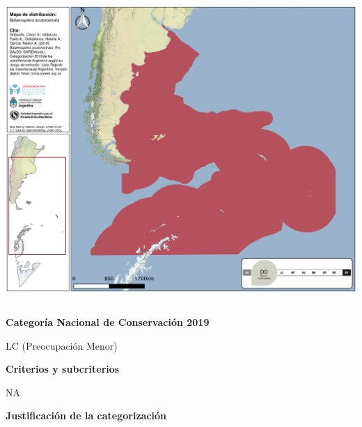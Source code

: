 \documentclass[
  x11names]{article}
\begin{document}
\includegraphics[width=1\linewidth]{maps/Cetartiodactyla/Balaenoptera_acutorostrata}

%
\begin{table}[H]
\centering
\begin{tabular}[t]{>{\raggedright\arraybackslash}m{16cm}>{}m{16cm}}
\toprule
\cellcolor{ceil}{\textcolor{white}{\textbf{\rule{0pt}{14pt}CATEGORÍAS DE CONSERVACIÓN}}}\\
\bottomrule
\end{tabular}
\end{table}

\vspace{-0.4cm}

\textbf{Categoría Nacional de Conservación 2019}

LC (Preocupación Menor)

\textbf{Criterios y subcriterios}

NA

\textbf{Justificación de la categorización}
\end{document}
